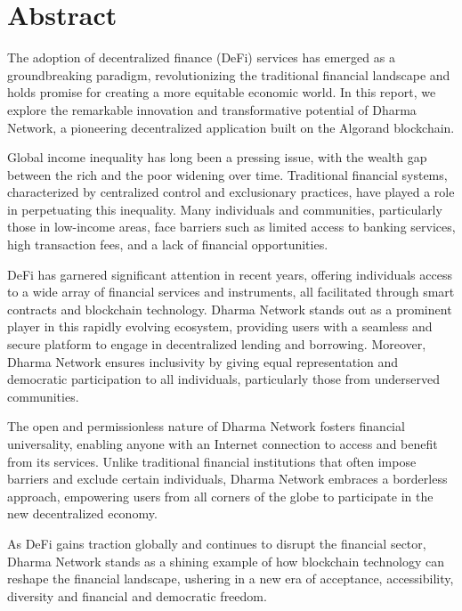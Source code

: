 \chapter*{Abstract}

\providecommand{\keywords}[1]
{
  \small	
  \textbf{\textit{Keywords---}} #1
}


The adoption of decentralized finance (DeFi) services has emerged as a groundbreaking paradigm, revolutionizing the traditional financial landscape and holds promise for creating a more equitable economic world. In this report, we explore the remarkable innovation and transformative potential of Dharma Network, a pioneering decentralized application built on the Algorand blockchain.\newline

Global income inequality has long been a pressing issue, with the wealth gap between the rich and the poor widening over time. Traditional financial systems, characterized by centralized control and exclusionary practices, have played a role in perpetuating this inequality. Many individuals and communities, particularly those in low-income areas, face barriers such as limited access to banking services, high transaction fees, and a lack of financial opportunities.\newline

DeFi has garnered significant attention in recent years, offering individuals access to a wide array of financial services and instruments, all facilitated through smart contracts and blockchain technology. Dharma Network stands out as a prominent player in this rapidly evolving ecosystem, providing users with a seamless and secure platform to engage in decentralized lending and borrowing. Moreover, Dharma Network ensures inclusivity by giving equal representation and democratic participation to all individuals, particularly those from underserved communities.\newline

The open and permissionless nature of Dharma Network fosters financial universality, enabling anyone with an Internet connection to access and benefit from its services. Unlike traditional financial institutions that often impose barriers and exclude certain individuals, Dharma Network embraces a borderless approach, empowering users from all corners of the globe to participate in the new decentralized economy.\newline

As DeFi gains traction globally and continues to disrupt the financial sector, Dharma Network stands as a shining example of how blockchain technology can reshape the financial landscape, ushering in a new era of acceptance, accessibility, diversity and financial and democratic freedom.\newline

